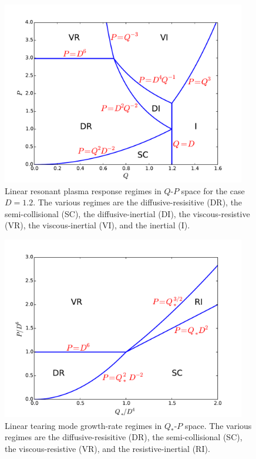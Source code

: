 \documentclass[12pt,prb,aps]{revtex4-1}
\begin{document}
\begin{figure}
\centerline{\includegraphics[width=0.95\textwidth]{Figure2.pdf}}
\caption{Linear resonant plasma response regimes in $Q$-$P$ space for the case $D=1.2$. The various regimes are
the diffusive-resisitive (DR), the semi-collisional (SC), the diffusive-inertial (DI), the viscous-resistive (VR), the viscous-inertial
(VI), and the inertial (I).}\label{f2}
\end{figure}

\begin{figure}
\centerline{\includegraphics[width=0.95\textwidth]{Figure3.pdf}}
\caption{Linear tearing mode growth-rate regimes  in $Q_\ast$-$P$ space. The various regimes are
the diffusive-resisitive (DR), the semi-collisional (SC),  the viscous-resistive (VR), and the resistive-inertial (RI).}\label{f3}
\end{figure}
\end{document}
